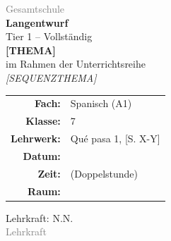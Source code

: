\documentclass[11pt,a4paper]{article}
\newcommand{\fach}{Spanisch}
\newcommand{\jahrgangsstufe}{7}
\newcommand{\schulart}{Gesamtschule}
\newcommand{\stundenthema}{[THEMA]}                %
\newcommand{\reihenthema}{[SEQUENZTHEMA]}          %
\newcommand{\lehrkraft}{N.N.}
\newcommand{\ausbildungsstand}{Lehrkraft}
\newcommand{\gerniveau}{A1}                        %
\newcommand{\lehrwerk}{Qué pasa 1}
\newcommand{\lehrwerkseite}{[S. X-Y]}
\begin{document}
\begin{titlepage}
    \centering
    \vspace*{2cm}

    {\large\textcolor{gray}{\schulart}}\\[2cm]

    {\Huge\textcolor{fach}{\textbf{Langentwurf}}}\\[0.5cm]
    {\large Tier 1 -- Vollständig}\\[2cm]

    {\LARGE\textbf{\stundenthema}}\\[0.5cm]
    {\large im Rahmen der Unterrichtsreihe}\\[0.3cm]
    {\Large\textit{\reihenthema}}\\[2cm]

    \begin{tabular}{rl}
        \textbf{Fach:} & \fach{} (\gerniveau) \\[0.3cm]
        \textbf{Klasse:} & \jahrgangsstufe \\[0.3cm]
        \textbf{Lehrwerk:} & \lehrwerk, \lehrwerkseite \\[0.3cm]
        \textbf{Datum:} & \underline{\hspace{3cm}} \\[0.3cm]
        \textbf{Zeit:} & \underline{\hspace{3cm}} (Doppelstunde) \\[0.3cm]
        \textbf{Raum:} & \underline{\hspace{3cm}} \\[0.3cm]
    \end{tabular}

    \vfill

    {\large Lehrkraft: \lehrkraft}\\[0.3cm]
    {\normalsize\textcolor{gray}{\ausbildungsstand}}\\[1cm]

\end{titlepage}

\tableofcontents
\newpage

\end{document}
